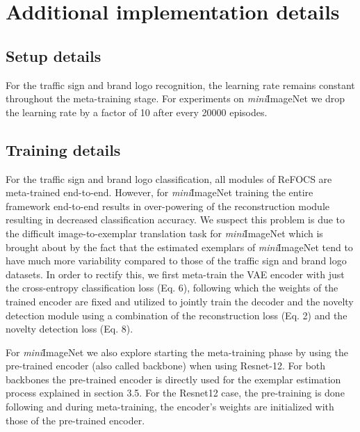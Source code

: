 \documentclass[10pt,journal,compsoc]{IEEEtran}
\begin{document}


    \section{Additional implementation details}
    \subsection{Setup details}
    For the traffic sign and brand logo recognition, the learning rate remains constant throughout the meta-training stage. For experiments on \textit{mini}ImageNet we drop the learning rate by a factor of 10 after every 20000 episodes.
    \subsection{Training details}
    For the traffic sign and brand logo classification, all modules of ReFOCS are meta-trained end-to-end. However, for \textit{mini}ImageNet training the entire framework end-to-end results in over-powering of the reconstruction module resulting in decreased classification accuracy. We suspect this problem is due to the difficult image-to-exemplar translation task for \textit{mini}ImageNet which is brought about by the fact that the estimated exemplars of \textit{mini}ImageNet tend to have much more variability compared to those of the traffic sign and brand logo datasets. In order to rectify this, we first meta-train the VAE encoder with just the cross-entropy classification loss (Eq. 6), following which the weights of the trained encoder are fixed and utilized to jointly train the decoder and the novelty detection module using a combination of the reconstruction loss (Eq. 2) and the novelty detection loss (Eq. 8). 

    For \textit{mini}ImageNet we also explore starting the meta-training phase by using the pre-trained encoder (also called backbone) when using Resnet-12. For both backbones the pre-trained encoder is directly used for the exemplar estimation process explained in section 3.5. For the Resnet12 case, the pre-training is done following \cite{snatcher} and during meta-training, the encoder's weights are initialized with those of the pre-trained encoder. 
    
    
\end{document}
